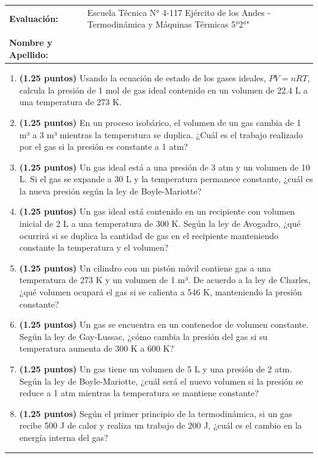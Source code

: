 \documentclass[../examen.tex]{subfiles}
\begin{document}
\noindent
\begin{tabular}{ll}
\textbf{Evaluación:} & Escuela Técnica N° 4-117 Ejército de los Andes - Termodinámica y Máquinas Térmicas 5°2°" \\
 & \\

\textbf{Nombre y Apellido:} & \hrulefill \\
\end{tabular}

\begin{enumerate}

    \item \textbf{(1.25 puntos)} Usando la ecuación de estado de los gases ideales, \( PV = nRT \), calcula la presión de 1 mol de gas ideal contenido en un volumen de 22.4 L a una temperatura de 273 K.

    \item \textbf{(1.25 puntos)} En un proceso isobárico, el volumen de un gas cambia de 1 m³ a 3 m³ mientras la temperatura se duplica. ¿Cuál es el trabajo realizado por el gas si la presión es constante a 1 atm?

    \item \textbf{(1.25 puntos)} Un gas ideal está a una presión de 3 atm y un volumen de 10 L. Si el gas se expande a 30 L y la temperatura permanece constante, ¿cuál es la nueva presión según la ley de Boyle-Mariotte?
    
    \item \textbf{(1.25 puntos)} Un gas ideal está contenido en un recipiente con volumen inicial de 2 L a una temperatura de 300 K. Según la ley de Avogadro, ¿qué ocurrirá si se duplica la cantidad de gas en el recipiente manteniendo constante la temperatura y el volumen?

    \item \textbf{(1.25 puntos)} Un cilindro con un pistón móvil contiene gas a una temperatura de 273 K y un volumen de 1 m³. De acuerdo a la ley de Charles, ¿qué volumen ocupará el gas si se calienta a 546 K, manteniendo la presión constante?

    \item \textbf{(1.25 puntos)} Un gas se encuentra en un contenedor de volumen constante. Según la ley de Gay-Lussac, ¿cómo cambia la presión del gas si su temperatura aumenta de 300 K a 600 K?

    \item \textbf{(1.25 puntos)} Un gas tiene un volumen de 5 L y una presión de 2 atm. Según la ley de Boyle-Mariotte, ¿cuál será el nuevo volumen si la presión se reduce a 1 atm mientras la temperatura se mantiene constante?

    

    \item \textbf{(1.25 puntos)} Según el primer principio de la termodinámica, si un gas recibe 500 J de calor y realiza un trabajo de 200 J, ¿cuál es el cambio en la energía interna del gas?
\end{enumerate}

\vspace{0.6cm}
\rule{.9\textwidth}{.1mm}
\vspace{0.6cm}
\end{document}
